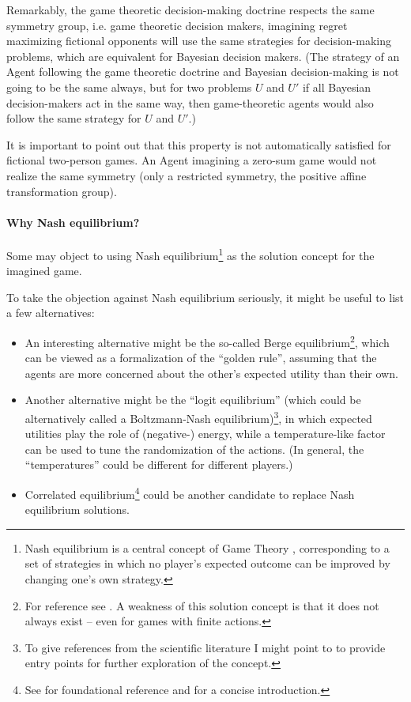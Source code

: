 \documentclass{article}
\begin{document}
Remarkably, the game theoretic decision-making doctrine respects the same symmetry group, i.e. game theoretic decision makers, imagining regret maximizing fictional opponents will use the same strategies for decision-making problems, which are equivalent for Bayesian decision makers. (The strategy of an Agent following the game theoretic doctrine and Bayesian decision-making is not going to be the same always, but for two problems $U$ and $U'$ if all Bayesian decision-makers act in the same way, then game-theoretic agents would also follow the same strategy for $U$ and $U'$.)

It is important to point out that this property is not automatically satisfied for fictional two-person games. An Agent imagining a zero-sum game would not realize the same symmetry (only a restricted symmetry, the positive affine transformation group).

\paragraph{Why Nash equilibrium?}
Some may object to using Nash equilibrium\footnote{Nash equilibrium is a central concept of Game Theory \cite{book:EssentialGameTheory,book:GameTheory,book:GameTheoryAlive,review:NeumannMorgensternGameThoery,book:GameTheoryOriginal}, corresponding to a set of strategies in which no player's expected outcome can be improved by changing one's own strategy.} as the solution concept for the imagined game.

To take the objection against Nash equilibrium seriously, it might be useful to list a few alternatives:
\begin{itemize}
    \item An interesting alternative might be the so-called Berge equilibrium\footnote{For reference see \cite{book:BergeEquilibrium}. A weakness of this solution concept is that it does not always exist \cite{paper:NoBergeEquilibria} -- even for games with finite actions.}, which can be viewed as a formalization of the ``golden rule'', assuming that the agents are more concerned about the other's expected utility than their own.
    \item Another alternative might be the ``logit equilibrium'' (which could be alternatively called a Boltzmann-Nash equilibrium)\footnote{To give references from the scientific literature I might point to \cite{paper:LogitEquilibrium,arxiv:WolpertEquilibrium} to provide entry points for further exploration of the concept.}, in which expected utilities play the role of (negative-) energy, while a temperature-like factor can be used to tune the randomization of the actions. (In general, the ``temperatures'' could be different for different players.)
    \item Correlated equilibrium\footnote{See \cite{paper:CorrelatedEquilibrium} for foundational reference and \cite{book:EssentialGameTheory} for a concise introduction.} could be another candidate to replace Nash equilibrium solutions.
\end{itemize}
\end{document}
